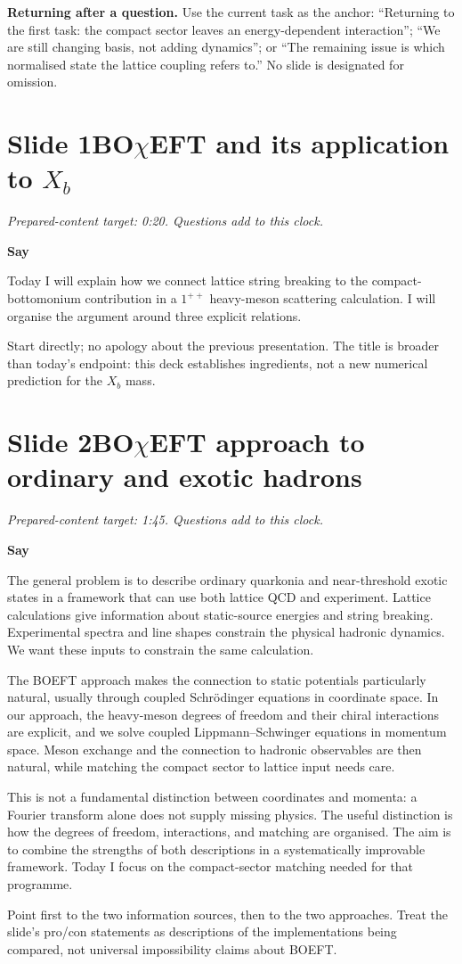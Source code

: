 \documentclass[11pt,a4paper]{article}
\newcommand{\cue}[1]{\begin{private}#1\end{private}}
\newenvironment{speech}{\par\textbf{Say}\par}{\par}
\newcommand{\slidenote}[3]{%
  \clearpage
  \pdfbookmark[1]{Slide #1}{slide-#1}%
  \section*{Slide #1\quad #2}
  \textit{Prepared-content target: #3. Questions add to this clock.}\par
}
\begin{document}
\textbf{Returning after a question.} Use the current task as the anchor:
``Returning to the first task: the compact sector leaves an energy-dependent
interaction''; ``We are still changing basis, not adding dynamics''; or
``The remaining issue is which normalised state the lattice coupling refers to.''
No slide is designated for omission.

\slidenote{1}{BO$\chi$EFT and its application to $X_b$}{0:20}
\begin{speech}
Today I will explain how we connect lattice string breaking to the
compact-bottomonium contribution in a $1^{++}$ heavy-meson scattering
calculation. I will organise the argument around three explicit relations.
\end{speech}
\cue{Start directly; no apology about the previous presentation. The title is
broader than today's endpoint: this deck establishes ingredients, not a new
numerical prediction for the $X_b$ mass.}

\slidenote{2}{BO$\chi$EFT approach to ordinary and exotic hadrons}{1:45}
\begin{speech}
The general problem is to describe ordinary quarkonia and near-threshold
exotic states in a framework that can use both lattice QCD and experiment.
Lattice calculations give information about static-source energies and
string breaking. Experimental spectra and line shapes constrain the
physical hadronic dynamics. We want these inputs to constrain the same
calculation.

The BOEFT approach makes the connection to static potentials particularly
natural, usually through coupled Schr\"odinger equations in coordinate
space. In our approach, the heavy-meson degrees of freedom and their chiral
interactions are explicit, and we solve coupled Lippmann--Schwinger
equations in momentum space. Meson exchange and the connection to
hadronic observables are then natural, while matching the compact sector
to lattice input needs care.

This is not a fundamental distinction between coordinates and momenta:
a Fourier transform alone does not supply missing physics. The useful
distinction is how the degrees of freedom, interactions, and matching are
organised. The aim is to combine the strengths of both descriptions in a
systematically improvable framework. Today I focus on the compact-sector
matching needed for that programme.
\end{speech}
\cue{Point first to the two information sources, then to the two approaches.
Treat the slide's pro/con statements as descriptions of the implementations
being compared, not universal impossibility claims about BOEFT.}
\end{document}
